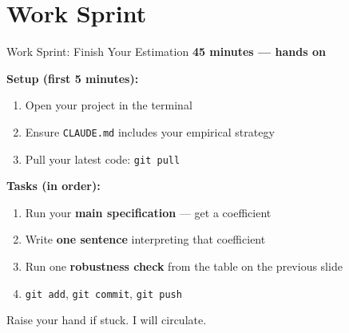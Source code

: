 
\section{Work Sprint}

\begin{frame}{Work Sprint: Finish Your Estimation}
  \textbf{\textcolor{usfgreen}{45 minutes --- hands on}}

  \vspace{4pt}

  \textbf{Setup (first 5 minutes):}
  \begin{enumerate}
    \item Open your project in the terminal
    \item Ensure \texttt{CLAUDE.md} includes your empirical strategy
    \item Pull your latest code: \texttt{git pull}
  \end{enumerate}

  \vspace{4pt}

  \textbf{Tasks (in order):}
  \begin{enumerate}
    \item[\textbf{1.}] Run your \textbf{main specification} --- get a coefficient
    \item[\textbf{2.}] Write \textbf{one sentence} interpreting that coefficient
    \item[\textbf{3.}] Run one \textbf{robustness check} from the table on the previous slide
    \item[\textbf{4.}] \texttt{git add}, \texttt{git commit}, \texttt{git push}
  \end{enumerate}

  \vspace{4pt}

  Raise your hand if stuck. I will circulate.
\end{frame}

